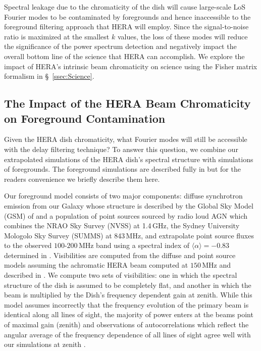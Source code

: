 \documentclass[twocolumn]{emulateapj}
\begin{document}
Spectral leakage due to the chromaticity of the dish will cause large-scale LoS Fourier modes to be contaminated by foregrounds and hence inaccessible to the foreground filtering approach that HERA will employ. Since the signal-to-noise ratio is maximized at the smallest $k$ values, the loss of these modes will reduce the significance of the power spectrum detection and negatively impact the overall bottom line of the science that HERA can accomplish. We explore the impact of HERA's intrinsic beam chromaticity on science using the Fisher matrix formalism in \S~\ref{ssec:Science}. 

\subsection{The Impact of the HERA Beam Chromaticity on Foreground Contamination}\label{ssec:Leakage}

Given the HERA dish chromaticity, what Fourier modes will still be accessible with the delay filtering technique? To answer this question, we combine our extrapolated simulations of the HERA dish's spectral structure with simulations of foregrounds. The foreground simulations are described fully in \citep{Thyagarajan:2015c} but for the readers convenience we briefly describe them here. 

Our foreground model consists of two major components: diffuse synchrotron emission from our Galaxy whose structure is described by the Global Sky Model (GSM) of \citet{deOliviaCosta:2008} and a population of point sources sourced by radio loud AGN which combines the NRAO Sky Survey (NVSS) \citep{Condon:1998} at 1.4\,GHz, the Sydney University Mologolo Sky Survey (SUMMS) \citep{Bok:1999} at 843\,MHz, and extrapolate point source fluxes to the observed $100$-$200$\,MHz band using a spectral index of $\langle \alpha \rangle=-0.83$ determined in \citet{Mauch:2003}. Visibilities are computed from the diffuse and point source models assuming the achromatic HERA beam computed at $150$\,MHz and described in \citep{Neben:2015c}. We compute two sets of visibilities: one in which the spectral structure of the dish is assumed to be completely flat, and another in which the beam is multiplied by the Dish's frequency dependent gain at zenith. While this model assumes incorrectly that the frequency evolution of the primary beam is identical along all lines of sight, the majority of power enters at the beams point of maximal gain (zenith) and observations of autocorrelations which reflect the angular average of the frequency dependence of all lines of sight agree well with our simulations at zenith \citep{Patra:2015}. 
\end{document}
